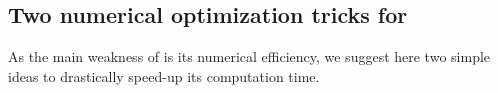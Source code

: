 


\subsection{Two numerical optimization tricks for \GLRklUCB}\label{sub:6:IdeasOptimizations}

As the main weakness of \GLRklUCB{} is its numerical efficiency,
we suggest here two simple ideas to drastically speed-up its computation time.


